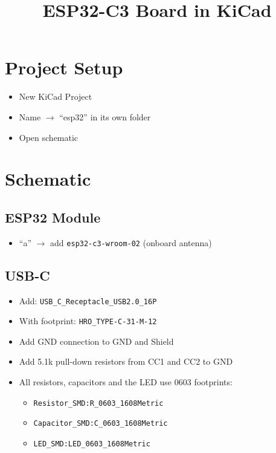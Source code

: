 \documentclass[11pt]{article}
\title{ESP32-C3 Board in KiCad}
\author{}
\date{}
\begin{document}
\maketitle

\section{Project Setup}

\begin{itemize}
  \item New KiCad Project
  \item Name $\rightarrow$ ``esp32'' in its own folder
  \item Open schematic
\end{itemize}

\section{Schematic}

\subsection{ESP32 Module}

\begin{itemize}
  \item ``a'' $\rightarrow$ add \texttt{esp32-c3-wroom-02} (onboard antenna)
\end{itemize}

\subsection{USB-C}

\begin{itemize}
  \item Add: \texttt{USB\_C\_Receptacle\_USB2.0\_16P}
  \item With footprint: \texttt{HRO\_TYPE-C-31-M-12}
  \item Add GND connection to GND and Shield
  \item Add 5.1k pull-down resistors from CC1 and CC2 to GND
  \item All resistors, capacitors and the LED use 0603 footprints:
  \begin{itemize}
    \item \texttt{Resistor\_SMD:R\_0603\_1608Metric}
    \item \texttt{Capacitor\_SMD:C\_0603\_1608Metric}
    \item \texttt{LED\_SMD:LED\_0603\_1608Metric}
  \end{itemize}
\end{itemize}
\end{document}
